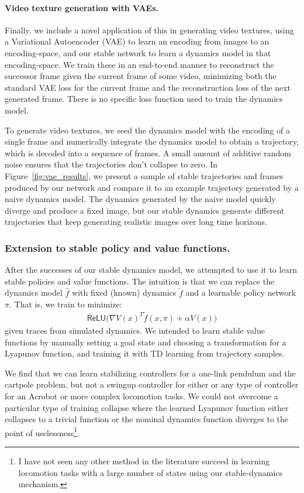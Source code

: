 \documentclass[11pt]{article}
\begin{document}
\paragraph{Video texture generation with VAEs. } Finally, we include a novel application of this in generating video textures, using a Variational Autoencoder (VAE) \citep{kingma2013auto} to learn an encoding from images to an encoding-space, and our stable network to learn a dynamics model in that encoding-space. We train these in an end-to-end manner to reconstruct the successor frame given the current frame of some video, minimizing both the standard VAE loss for the current frame and the reconstruction loss of the next generated frame. There is no specific loss function used to train the dynamics model.

To generate video textures, we seed the dynamics model with the encoding of a single frame and numerically integrate the dynamics model to obtain a trajectory, which is decoded into a sequence of frames. A small amount of additive random noise ensures that the trajectories don't collapse to zero. In Figure~\ref{fig:vae_results}, we present a sample of stable trajectories and frames produced by our network and compare it to an example trajectory generated by a naive dynamics model. The dynamics generated by the naive model quickly diverge and produce a fixed image, but our stable dynamics generate different trajectories that keep generating realistic images over long time horizons.

\subsubsection{Extension to stable policy and value functions. }

After the successes of our stable dynamics model, we attempted to use it to learn stable policies and value functions. The intuition is that we can replace the dynamics model $\hat f$ with fixed (known) dynamics $\tilde f$ and a learnable policy network $\pi$. That is, we train to minimize:
\begin{align}
  \mathsf{ReLU}\bigl(\nabla V(x)^T \tilde{f}(x, \pi) + \alpha V (x) \bigr)
\end{align}
given traces from simulated dynamics. We intended to learn stable value functions by manually setting a goal state and choosing a transformation for a Lyapunov function, and training it with TD learning from trajectory samples.

We find that we can learn stabilizing controllers for a one-link pendulum and the cartpole problem, but not a swingup controller for either or any type of controller for an Acrobot or more complex locomotion tasks. We could not overcome a particular type of training collapse where the learned Lyapunov function either collapses to a trivial function or the nominal dynamics function diverges to the point of uselessness\footnote{I have not seen any other method in the literature succeed in learning locomotion tasks with a large number of states using our stable-dynamics mechanism. }.
\end{document}
